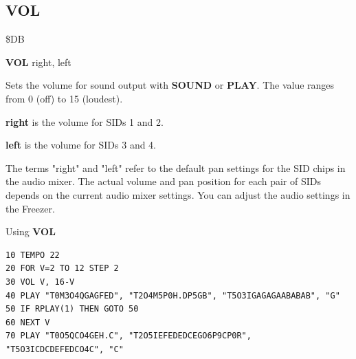 \subsection{VOL}
\begin{description}[leftmargin=2cm,style=nextline]
\item [Token:]    \$DB

\item [Format:]   {\bf VOL} right, left

\item [Usage:]    Sets the volume for sound output with {\bf SOUND} or {\bf PLAY}. The value ranges from 0 (off) to 15 (loudest).

                  {\bf right} is the volume for SIDs 1 and 2.
                 
                  {\bf left} is the volume for SIDs 3 and 4.

\item [Remarks:]  The terms "right" and "left" refer to the default pan settings for the SID chips in the audio mixer. The actual volume and pan position for each pair of SIDs depends on the current audio mixer settings. You can adjust the audio settings in the Freezer.

\item [Example:]  Using {\bf VOL}

\begin{tcolorbox}[colback=black,coltext=white]
\verbatimfont{\codefont}
\begin{verbatim}
10 TEMPO 22
20 FOR V=2 TO 12 STEP 2
30 VOL V, 16-V
40 PLAY "T0M3O4QGAGFED", "T2O4M5P0H.DP5GB", "T5O3IGAGAGAABABAB", "G"
50 IF RPLAY(1) THEN GOTO 50
60 NEXT V
70 PLAY "T0O5QCO4GEH.C", "T2O5IEFEDEDCEGO6P9CP0R", "T5O3ICDCDEFEDCO4C", "C"
\end{verbatim}
\end{tcolorbox}
\end{description}


\newpage
